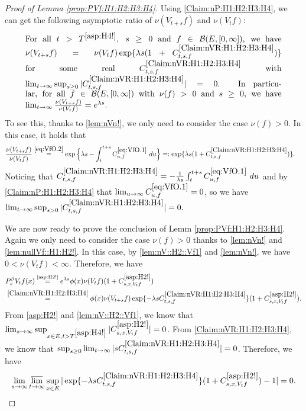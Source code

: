 \documentclass[12pt,a4paper]{amsart}
\numberwithin{equation}{section}
\theoremstyle{plain}
\theoremstyle{definition}
\theoremstyle{remark}
\begin{document}
\begin{proof}[Proof of Lemma \ref{prop:PVf:H1:H2:H3:H4}]
	Using \eqref{Claim:nP:H1:H2:H3:H4}, we can get the following asymptotic ratio of $\nu(V_{t+s}f)$ and $\nu(V_tf)$:
\begin{equation} \label{Claim:nVR:H1:H2:H3:H4}
\begin{minipage}{0.9\textwidth}
	For all $t> T^{\eqref{asp:H4!}},~s \geq 0$ and $f\in \mathcal B(E,[0,\infty])$, we have $\nu(V_{t+s}f) = \nu(V_tf) \exp\{\lambda s (1+C^{\eqref{Claim:nVR:H1:H2:H3:H4}}_{t,s,f}) \}$ for some real $C^{\eqref{Claim:nVR:H1:H2:H3:H4}}_{t,s,f}$ with $\lim_{t\to \infty} \sup_{s\geq  0} |C^{\eqref{Claim:nVR:H1:H2:H3:H4}}_{t,s,f}| = 0$.
	In particular, for all $f\in \mathcal B(E,[0,\infty])$ with $\nu(f)>0$ and $s\geq 0$, we have $\lim_{t\to \infty} \frac{\nu(V_{t+s}f)}{\nu(V_tf)} = e^{\lambda s}$.
\end{minipage}
\end{equation}
	To see this, thanks to \eqref{lem:nVn!},
	we only need to consider the case $\nu(f)>0$. In this case,  it holds  that
\begin{align}
	&\frac{\nu(V_{t+s} f)} {\nu(V_t f)}
	\overset{\eqref{eq:VfO.2}}= \exp\Big\{\lambda s- \int_t^{t+s} C^{\eqref{eq:VfO.1}}_{u,f} ~du\Big\}
	=: \exp\{\lambda s (1+C^{\eqref{Claim:nVR:H1:H2:H3:H4}}_{t,s,f}) \}.
\end{align}
	Noticing that $C^{\eqref{Claim:nVR:H1:H2:H3:H4}}_{t,s,f} = -\frac{1}{\lambda s}\int_t^{t+s} C^{\eqref{eq:VfO.1}}_{u,f} ~du$ and by \eqref{Claim:nP:H1:H2:H3:H4} that $\lim_{u\to \infty}C^{\eqref{eq:VfO.1}}_{u,f} = 0$, so we have $\lim_{t\to \infty} \sup_{s> 0} |C^{\eqref{Claim:nVR:H1:H2:H3:H4}}_{t,s,f}| = 0. $
	
	We are now  ready to prove the conclusion of Lemm \ref{prop:PVf:H1:H2:H3:H4}.
	Again we only need to consider the case $\nu(f)>0$ thanks to \eqref{lem:nVn!} and  \eqref{lem:nullVf::H1:H2!}.
	In this case, by \eqref{lem:nV::H2::Vf1} and \eqref{lem:nVn!}, we have $0<\nu(V_{t}f)<\infty$.
	Therefore, we have
\begin{align}
	& P_s^\beta V_t f(x)
	\overset{\text{\eqref{asp:H2!}}}= e^{\lambda s} \phi(x) \nu(V_tf) (1+C^{\eqref{asp:H2!}}_{s,x,V_tf})
	\\&\overset{\eqref{Claim:nVR:H1:H2:H3:H4}}= \phi(x) \nu(V_{t+s}f) \exp\{-\lambda s C^{\eqref{Claim:nVR:H1:H2:H3:H4}}_{t,s,f}\} (1+C^{\eqref{asp:H2!}}_{s,x,V_tf}).
\end{align}
	From \eqref{asp:H2!} and \eqref{lem:nV::H2::Vf1}, we know that $\lim_{s\to \infty} \sup_{x\in E, t> T^{\eqref{asp:H4!}}} |C^{\eqref{asp:H2!}}_{s,x,V_tf}| = 0$.
	From \eqref{Claim:nVR:H1:H2:H3:H4}, we know that $\sup_{s\geq 0} \lim_{t\to \infty} |sC^{\eqref{Claim:nVR:H1:H2:H3:H4}}_{t,s,f}| = 0$.
	Therefore, we have \[\lim_{s\to \infty}\varlimsup_{t\to \infty}\sup_{x\in E}|\exp\{-\lambda s C^{\eqref{Claim:nVR:H1:H2:H3:H4}}_{t,s,f}\} (1+C^{\eqref{asp:H2!}}_{s,x,V_tf})-1| = 0. \qedhere\]
\end{proof}
\end{document}
